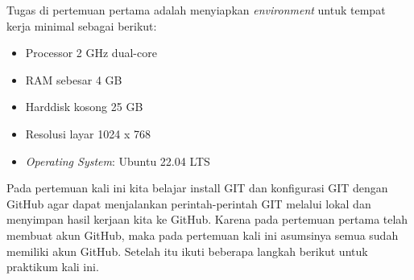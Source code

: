 \documentclass[a4paper]{tufte-handout}
\begin{document}
Tugas di pertemuan pertama adalah menyiapkan \textit{environment} untuk tempat kerja minimal sebagai berikut:
\begin{multicols}{2}
\begin{itemize}
\setlength\itemsep{0em}
\item Processor 2 GHz dual-core
\item RAM sebesar 4 GB
\item Harddisk kosong 25 GB
\item Resolusi layar 1024 x 768
\item \textit{Operating System}: Ubuntu 22.04 LTS
\end{itemize}
\end{multicols}
\hrulefill

\clearpage
{}


Pada pertemuan kali ini kita belajar install GIT dan konfigurasi GIT dengan GitHub agar dapat menjalankan perintah-perintah GIT melalui lokal dan menyimpan hasil kerjaan kita ke GitHub. Karena pada pertemuan pertama telah membuat akun GitHub, maka pada pertemuan kali ini asumsinya semua sudah memiliki akun GitHub. Setelah itu ikuti beberapa langkah berikut untuk praktikum kali ini.
\end{document}

